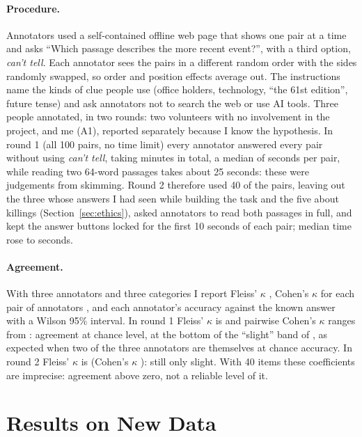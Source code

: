 \documentclass[11pt]{article}
\begin{document}
\paragraph{Procedure.} Annotators used a self-contained offline web page that shows one pair at a time and asks ``Which passage describes the more recent event?'', with a third option, \emph{can't tell}. Each annotator sees the pairs in a different random order with the sides randomly swapped, so order and position effects average out. The instructions name the kinds of clue people use (office holders, technology, ``the 61st edition'', future tense) and ask annotators not to search the web or use AI tools. Three people annotated, in two rounds: two volunteers with no involvement in the project, and me (A1), reported separately because I know the hypothesis. In round 1 (all 100 pairs, no time limit) every annotator answered every pair without using \emph{can't tell}, taking \HumanTotalRangeOne{} minutes in total, a median of \HumanMedianRangeOne{} seconds per pair, while reading two 64-word passages takes about 25 seconds: these were judgements from skimming. Round 2 therefore used 40 of the pairs, leaving out the three whose answers I had seen while building the task and the five about killings (Section~\ref{sec:ethics}), asked annotators to read both passages in full, and kept the answer buttons locked for the first 10 seconds of each pair; median time rose to \HumanMedianRangeTwo{} seconds.

\paragraph{Agreement.} With three annotators and three categories I report Fleiss' $\kappa$ \citep{fleiss1971measuring}, Cohen's $\kappa$ for each pair of annotators \citep{cohen1960coefficient}, and each annotator's accuracy against the known answer with a Wilson 95\% interval. In round 1 Fleiss' $\kappa$ is \FleissKOne{} and pairwise Cohen's $\kappa$ ranges from \CohenHumanRangeOne{}: agreement at chance level, at the bottom of the ``slight'' band of \citet{landis1977measurement}, as expected when two of the three annotators are themselves at chance accuracy. In round 2 Fleiss' $\kappa$ is \FleissKTwo{} (Cohen's $\kappa$ \CohenHumanRangeTwo{}): still only slight. With 40 items these coefficients are imprecise: agreement above zero, not a reliable level of it.

\section{Results on New Data}
\label{sec:results}
\end{document}
